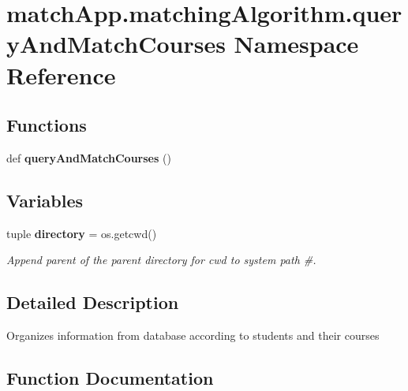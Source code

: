 \section{match\+App.\+matching\+Algorithm.\+query\+And\+Match\+Courses Namespace Reference}
\label{namespacematch_app_1_1matching_algorithm_1_1query_and_match_courses}
\subsection*{Functions}
\begin{DoxyCompactItemize}
\item 
def {\bf query\+And\+Match\+Courses} ()
\end{DoxyCompactItemize}
\subsection*{Variables}
\begin{DoxyCompactItemize}
\item 
tuple {\bf directory} = os.\+getcwd()
\begin{DoxyCompactList}\small\item\em Append parent of the parent directory for cwd to system path \#. \end{DoxyCompactList}\end{DoxyCompactItemize}


\subsection{Detailed Description}
\begin{DoxyVerb}Organizes information from database according to students and their courses\end{DoxyVerb}
 

\subsection{Function Documentation}
